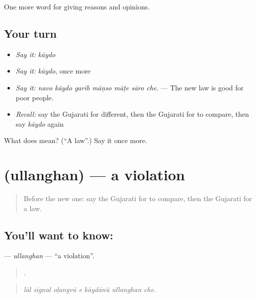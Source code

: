\begin{grammarlens}[title={What you've built}]
One more word for giving reasons and opinions.
\end{grammarlens}

\subsection*{Your turn}
\begin{itemize}
\raggedright
  \item \emph{Say it:} \emph{kāydo}
  \item \emph{Say it:} \emph{kāydo}, once more
  \item \emph{Say it:} \emph{navo kāydo garīb māṇso māṭe sāro che.} — The new law is good for poor people.
  \item \emph{Recall:} say the Gujarati for different, then the Gujarati for to compare, then say \emph{kāydo} again
\end{itemize}

\begin{tcolorbox}[breakable,colback=teal!4,colframe=teal!35!black,title={Before you move on}]
What does  mean? (\textquotedblleft{}A law\textquotedblright{}.) Say it once more.
\end{tcolorbox}
\section[\texorpdfstring{\gu{ઉલ્લંઘન} (ullanghan)}{ઉલ્લંઘન (ullanghan)}]{ (ullanghan) — a violation}

\label{lesson:GU-C347-ullanghan}



\begin{quote}
Before the new one: say the Gujarati for to compare, then the Gujarati for a law.
\end{quote}

\subsection*{You'll want to know: }
\textbf{} — \emph{ullanghan} — \textquotedblleft{}a violation\textquotedblright{}.

\begin{quote}
      .
\end{quote}

\begin{quote}
\emph{lāl signal oḷangvũ e kāydānũ ullanghan che.}
\end{quote}

